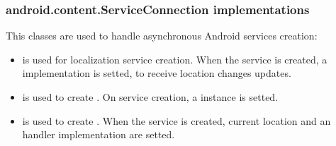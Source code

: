 	\subsubsection{android.content.ServiceConnection implementations} This classes are used to handle asynchronous Android services creation:
		\begin{itemize}
			\item {} is used for localization service creation. When the service is created, a  implementation is setted, to receive location changes updates.  
			\item {} is used to create . On service creation, a  instance is setted.
			\item {} is used to create . When the service is created, current location and an handler implementation are setted.   
		\end{itemize}  
